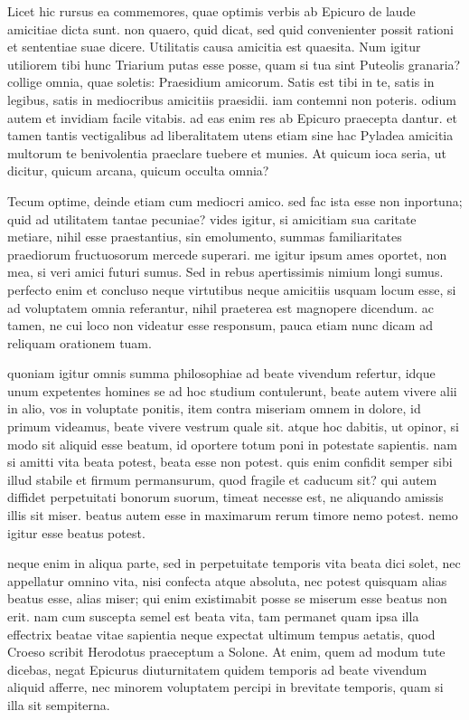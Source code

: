  Licet hic rursus ea commemores, quae optimis verbis ab Epicuro de laude amicitiae dicta sunt. non quaero, quid dicat, sed quid convenienter possit rationi et sententiae suae dicere. Utilitatis causa amicitia est quaesita. Num igitur utiliorem tibi hunc Triarium putas esse posse, quam si tua sint Puteolis granaria? collige omnia, quae soletis: Praesidium amicorum. Satis est tibi in te, satis in legibus, satis in mediocribus amicitiis praesidii. iam contemni non poteris. odium autem et invidiam facile vitabis. ad eas enim res ab Epicuro praecepta dantur. et tamen tantis vectigalibus ad liberalitatem utens etiam sine hac Pyladea amicitia multorum te benivolentia praeclare tuebere et munies. At quicum ioca seria, ut dicitur, quicum arcana, quicum occulta omnia?

 Tecum optime, deinde etiam cum mediocri amico. sed fac ista esse non inportuna; quid ad utilitatem tantae pecuniae? vides igitur, si amicitiam sua caritate metiare, nihil esse praestantius, sin emolumento, summas familiaritates praediorum fructuosorum mercede superari. me igitur ipsum ames oportet, non mea, si veri amici futuri sumus. Sed in rebus apertissimis nimium longi sumus. perfecto enim et concluso neque virtutibus neque amicitiis usquam locum esse, si ad voluptatem omnia referantur, nihil praeterea est magnopere dicendum. ac tamen, ne cui loco non videatur esse responsum, pauca etiam nunc dicam ad reliquam orationem tuam.

 quoniam igitur omnis summa philosophiae ad beate vivendum refertur, idque unum expetentes homines se ad hoc studium contulerunt, beate autem vivere alii in alio, vos in voluptate ponitis, item contra miseriam omnem in dolore, id primum videamus, beate vivere vestrum quale sit. atque hoc dabitis, ut opinor, si modo sit aliquid esse beatum, id oportere totum poni in potestate sapientis. nam si amitti vita beata potest, beata esse non potest. quis enim confidit semper sibi illud stabile et firmum permansurum, quod fragile et caducum sit? qui autem diffidet perpetuitati bonorum suorum, timeat necesse est, ne aliquando amissis illis sit miser. beatus autem esse in maximarum rerum timore nemo potest. nemo igitur esse beatus potest.

 neque enim in aliqua parte, sed in perpetuitate temporis vita beata dici solet, nec appellatur omnino vita, nisi confecta atque absoluta, nec potest quisquam alias beatus esse, alias miser; qui enim existimabit posse se miserum esse beatus non erit. nam cum suscepta semel est beata vita, tam permanet quam ipsa illa effectrix beatae vitae sapientia neque expectat ultimum tempus aetatis, quod Croeso scribit Herodotus praeceptum a Solone. At enim, quem ad modum tute dicebas, negat Epicurus diuturnitatem quidem temporis ad beate vivendum aliquid afferre, nec minorem voluptatem percipi in brevitate temporis, quam si illa sit sempiterna.


